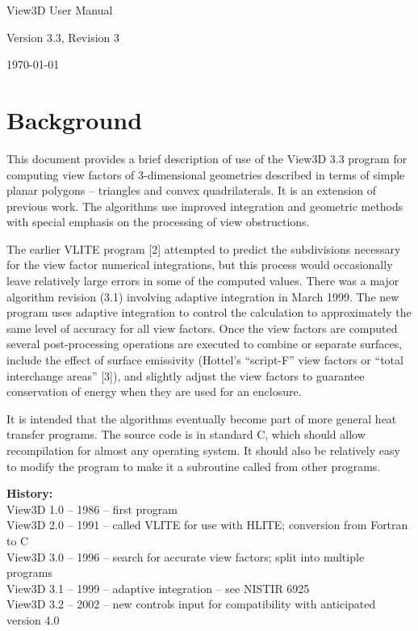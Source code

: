\documentclass[10pt]{article}
\begin{document}
\begin{titlepage}
\begin{center}
\begin{Huge}
View3D User Manual\\
\end{Huge}
\vspace{1cm}
\begin{Large}
Version 3.3, Revision 3\\
\end{Large}
\vspace{1cm}
\begin{Large}
\today
\end{Large}
\end{center}
\end{titlepage}
\section{Background}
This document provides a brief description of use of the View3D 3.3 program for
computing view factors of 3-dimensional geometries described in terms of simple
planar polygons – triangles and convex quadrilaterals. It is an extension of
previous work. The algorithms use improved integration and geometric methods 
with special emphasis on the processing of view obstructions. 

The earlier VLITE program [2] attempted to predict the subdivisions necessary
for the view factor numerical integrations, but this process would occasionally
leave relatively large errors in some of the computed values. There was a major
algorithm revision (3.1) involving adaptive integration in March 1999.  The new
program uses adaptive integration to control the calculation to approximately 
the same level of accuracy for all view factors. Once the view factors are
computed several post-processing operations are executed to combine or separate
surfaces, include the effect of surface emissivity (Hottel's ``script-F'' view
factors or ``total interchange areas'' [3]), and slightly adjust the view 
factors to guarantee conservation of energy when they are used for an enclosure.

It is intended that the algorithms eventually become part of more general heat
transfer programs. The source code is in standard C, which should allow
recompilation for almost any operating system. It should also be relatively 
easy to modify the program to make it a subroutine called from other programs.

\noindent
\textbf{History:}\\
View3D 1.0 -- 1986 -- first program\\
View3D 2.0 -- 1991 -- called VLITE for use with HLITE; conversion from
Fortran to C\\
View3D 3.0 -- 1996 -- search for accurate view factors; split into multiple
programs\\
View3D 3.1 -- 1999 -- adaptive integration – see NISTIR 6925\\
View3D 3.2 -- 2002 -- new controls input for compatibility with anticipated
version 4.0\\
\end{document}
